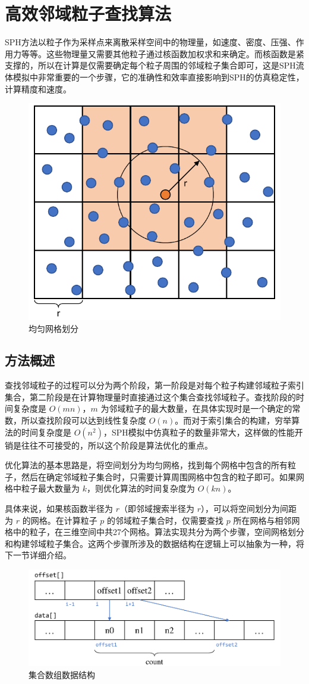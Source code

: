 \section{高效邻域粒子查找算法}
    SPH方法以粒子作为采样点来离散采样空间中的物理量，如速度、密度、压强、作用力等等。这些物理量又需要其他粒子通过核函数加权求和来确定。而核函数是紧支撑的，所以在计算是仅需要确定每个粒子周围的邻域粒子集合即可，这是SPH流体模拟中非常重要的一个步骤，它的准确性和效率直接影响到SPH的仿真稳定性，计算精度和速度。
    
    \begin{figure}[htbp]
    	\centering
    	\includegraphics[width=.35\textwidth]{figures/neighbor/uniform_grid.pdf}
    	\caption{均匀网格划分}
    \end{figure}

\subsection{方法概述}
    查找邻域粒子的过程可以分为两个阶段，第一阶段是对每个粒子构建邻域粒子索引集合，第二阶段是在计算物理量时直接通过这个集合查找邻域粒子。查找阶段的时间复杂度是 $O(mn)$，$m$ 为邻域粒子的最大数量，在具体实现时是一个确定的常数，所以查找阶段可以达到线性复杂度 $O(n)$。而对于索引集合的构建，穷举算法的时间复杂度是 $O(n^2)$，SPH模拟中仿真粒子的数量非常大，这样做的性能开销是往往不可接受的，所以这个阶段是算法优化的重点。
    
    优化算法的基本思路是，将空间划分为均匀网格，找到每个网格中包含的所有粒子，然后在确定邻域粒子集合时，只需要计算周围网格中包含的粒子即可。如果网格中粒子最大数量为 $k$，则优化算法的时间复杂度为 $O(kn)$。
    
    具体来说，如果核函数半径为 $r$（即邻域搜索半径为 $r$），可以将空间划分为间距为 $r$ 的网格。在计算粒子 $p$ 的邻域粒子集合时，仅需要查找 $p$ 所在网格与相邻网格中的粒子，在三维空间中共27个网格。算法实现共分为两个步骤，空间网格划分和构建邻域粒子集合。这两个步骤所涉及的数据结构在逻辑上可以抽象为一种，将下一节详细介绍。

    \begin{figure}
    	\centering
    	\includegraphics[width=.55\textwidth]{figures/neighbor/data_structure.pdf}
    	\caption{集合数组数据结构}
    \end{figure}

